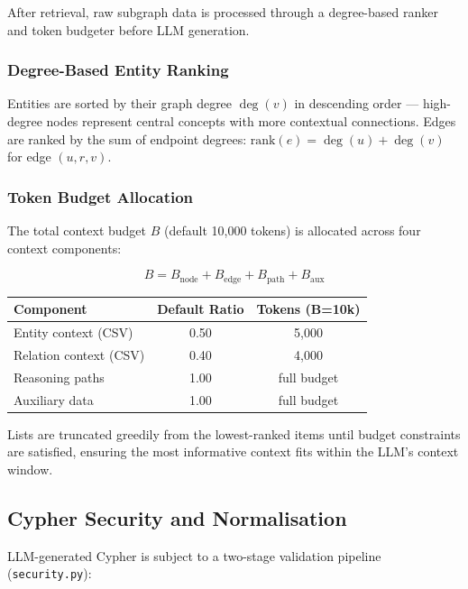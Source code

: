 \documentclass[12pt,a4paper]{article}
\begin{document}
After retrieval, raw subgraph data is processed through a degree-based ranker
and token budgeter before LLM generation.

\subsubsection{Degree-Based Entity Ranking}

Entities are sorted by their graph degree $\deg(v)$ in descending order —
high-degree nodes represent central concepts with more contextual connections.
Edges are ranked by the sum of endpoint degrees:
$\text{rank}(e) = \deg(u) + \deg(v)$ for edge $(u, r, v)$.

\subsubsection{Token Budget Allocation}

The total context budget $B$ (default 10,000 tokens) is allocated across
four context components:

\begin{equation}
B = B_{\text{node}} + B_{\text{edge}} + B_{\text{path}} + B_{\text{aux}}
\end{equation}

\begin{center}
\begin{tabular}{lcc}
\toprule
\textbf{Component} & \textbf{Default Ratio} & \textbf{Tokens (B=10k)} \\
\midrule
Entity context (CSV) & 0.50 & 5,000 \\
Relation context (CSV) & 0.40 & 4,000 \\
Reasoning paths & 1.00 & full budget \\
Auxiliary data & 1.00 & full budget \\
\bottomrule
\end{tabular}
\end{center}

Lists are truncated greedily from the lowest-ranked items until budget
constraints are satisfied, ensuring the most informative context fits
within the LLM's context window.

\subsection{Cypher Security and Normalisation}

LLM-generated Cypher is subject to a two-stage validation pipeline
(\texttt{security.py}):
\end{document}
